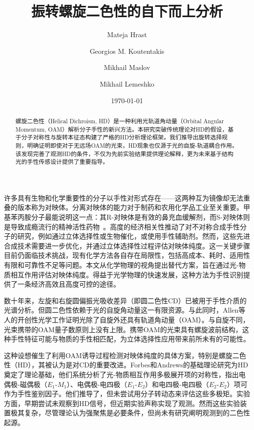 \documentclass[reprint,aps,prl,twocolumn,superscriptaddress,groupedaddress]{revtex4-2}
\newcommand{\eomo}{$E_1$-$M_1$}
\newcommand{\eoet}{$E_1$-$E_2$}
\newcommand{\etet}{$E_2$-$E_2$}
\begin{document}
\title{振转螺旋二色性的自下而上分析}
\author{Mateja Hrast}
\author{Georgios M. Koutentakis}
\author{Mikhail Maslov}
\author{Mikhail Lemeshko}
\date{\today}
\begin{abstract}
螺旋二色性（Helical Dichroism, HD）是一种利用光轨道角动量（Orbital Angular Momentum, OAM）解析分子手性的新兴方法。本研究突破传统理论对HD的假设，基于分子对称性与旋转本征态构建了严格的HD分析理论框架。我们推导出旋转选择规则，明确证明即使对于无远场OAM的光束，HD现象也仅源于光的自旋-轨道耦合作用。该发现完善了观测HD的条件，不仅为先前实验结果提供理论解释，更为未来基于结构光的手性传感设计提供了重要指导。
\end{abstract}
\maketitle
许多具有生物和化学重要性的分子以手性对形式存在——这两种互为镜像却无法重叠的版本称为对映体。分离对映体的能力对于制药和农用化学品工业至关重要\cite{MAIER2001}。甲基苯丙胺分子最能说明这一点：其R-对映体是有效的鼻充血缓解剂，而S-对映体则是导致成瘾流行的精神活性药物~\cite{barkholtz2023}。高度的经济相关性推动了对不对称合成手性分子的研究，例如通过立体选择性或生物催化，或使用手性辅助剂\cite{Brown1989}。然而，这些先进合成技术需要进一步优化，并通过立体选择性过程评估对映体纯度。这一关键步骤目前仍面临技术挑战，现有化学方法各自存在局限性，包括高成本、耗时、适用性有限和可靠性不足等问题\cite{qian2023}。本文从化学物理的视角提出替代方案，旨在通过光-物质相互作用评估对映体纯度。得益于光学物理的快速发展\cite{Koch2019}，这种方法为手性识别提供了一条经济高效且高度可控的途径。

数十年来，左旋和右旋圆偏振光吸收差异（即圆二色性CD）\cite{deutsche1970,Holzwarth1974}已被用于手性介质的光谱分析\cite{Miles2021}。但圆二色性依赖于光的自旋角动量这一有限资源。与此同时，Allen等人的开创性光学工作\cite{Allen1992}证明光除了自旋外还具有轨道角动量（OAM）。与自旋不同，光束携带的OAM量子数原则上没有上限。携带OAM的光束具有螺旋波前结构，这种手性特征可能与物质的手性相匹配，为立体选择性应用带来前所未有的可能性。

这种设想催生了利用OAM诱导过程检测对映体纯度的具体方案，特别是螺旋二色性（HD）\cite{ANDREWS2004,Ye2019,Li2021}，其被认为是对CD的重要改进\cite{Ye2019,Li2021}。Forbes和Andrews的基础理论研究\cite{Forbes2018,Forbes2019,Forbes2021}为HD奠定了理论基础，他们系统分析了光-物质相互作用多极展开项的对称性，指出电偶极-磁偶极（\eomo）、电偶极-电四极（\eoet）和电四极-电四极（\etet）项可作为手性鉴别因子。他们推导了，但未尝试用分子转动态来评估这些多极矩。实验方面，早期尝试未观察到HD信号\cite{Araoka2005,Loeffler2011}，但近期实验声称实现了观测\cite{Rusak2019,Zhang2020,Rouxel2022,Begin2023,Jain2023}。然而这些实验装置极其复杂，尽管理论认为强聚焦是必要条件\cite{Forbes2019}，但尚未有研究阐明观测到的二色性起源。
\end{document}
